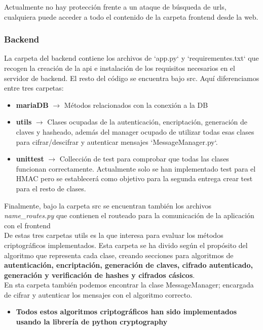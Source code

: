 \documentclass[a4paper,11pt]{article}
\begin{document}
Actualmente no hay protección frente a un ataque de búsqueda de urls, cualquiera puede acceder a todo el contenido de la carpeta frontend desde la web.

\subsubsection{Backend}
La carpeta del backend contiene los archivos de `app.py` y `requirementes.txt` que recogen la creación de la api e instalación de los requisitos necesarios en el servidor de backend. El resto del código se encuentra bajo src. Aquí diferenciamos entre tres carpetas:
\begin{itemize}
\item \textbf{mariaDB} $\rightarrow$ Métodos relacionados con la conexión a la DB

\item \textbf{utils} $\rightarrow$ Clases ocupadas de la autenticación, encriptación, generación de claves y hasheado, además del manager ocupado de utilizar todas esas clases para cifrar/descifrar y autenticar mensajes `MessageManager.py`.

\item \textbf{unittest} $\rightarrow$ Collección de test para comprobar que
    todas las clases funcionan correctamente. Actualmente solo se han
    implementado test para el HMAC pero se establecerá como objetivo para la
    segunda entrega crear test para el resto de clases.
\end{itemize}

Finalmente, bajo la carpeta src se encuentran también los archivos
\textit{name\_routes.py} que contienen el routeado para la comunicación de la aplicación
con el frontend\\

De estas tres carpetas utils es la que interesa para evaluar los métodos
criptográficos implementados. Esta carpeta se ha divido según el propósito del
algoritmo que representa cada clase, creando secciones para algoritmos de
\textbf{autenticación, encriptación, generación de claves, cifrado autenticado, generación y verificación de hashes y
cifrados cásicos}. \\
En sta carpeta también podemos encontrar la clase MessageManager; encargada de cifrar y
autenticar los mensajes con el algoritmo correcto. 
\begin{itemize}
    \item \textbf{Todos estos algoritmos criptográficos han sido implementados usando la librería de python cryptography}
\end{itemize}
\end{document}
